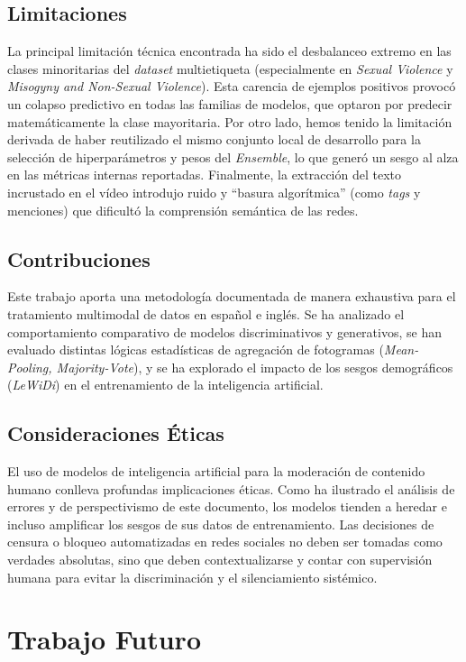 \subsection*{Limitaciones}
La principal limitación técnica encontrada ha sido el desbalanceo extremo en las clases minoritarias del \textit{dataset} multietiqueta (especialmente en \textit{Sexual Violence} y \textit{Misogyny and Non-Sexual Violence}). Esta carencia de ejemplos positivos provocó un colapso predictivo en todas las familias de modelos, que optaron por predecir matemáticamente la clase mayoritaria. Por otro lado, hemos tenido la limitación derivada de haber reutilizado el mismo conjunto local de desarrollo para la selección de hiperparámetros y pesos del \textit{Ensemble}, lo que generó un sesgo al alza en las métricas internas reportadas. Finalmente, la extracción del texto incrustado en el vídeo introdujo ruido y ``basura algorítmica'' (como \textit{tags} y menciones) que dificultó la comprensión semántica de las redes.

\subsection*{Contribuciones}
Este trabajo aporta una metodología documentada de manera exhaustiva para el tratamiento multimodal de datos en español e inglés. Se ha analizado el comportamiento comparativo de modelos discriminativos y generativos, se han evaluado distintas lógicas estadísticas de agregación de fotogramas (\textit{Mean-Pooling, Majority-Vote}), y se ha explorado el impacto de los sesgos demográficos (\textit{LeWiDi}) en el entrenamiento de la inteligencia artificial.

\subsection*{Consideraciones Éticas}
El uso de modelos de inteligencia artificial para la moderación de contenido humano conlleva profundas implicaciones éticas. Como ha ilustrado el análisis de errores y de perspectivismo de este documento, los modelos tienden a heredar e incluso amplificar los sesgos de sus datos de entrenamiento. Las decisiones de censura o bloqueo automatizadas en redes sociales no deben ser tomadas como verdades absolutas, sino que deben contextualizarse y contar con supervisión humana para evitar la discriminación y el silenciamiento sistémico. 

\section{Trabajo Futuro}
